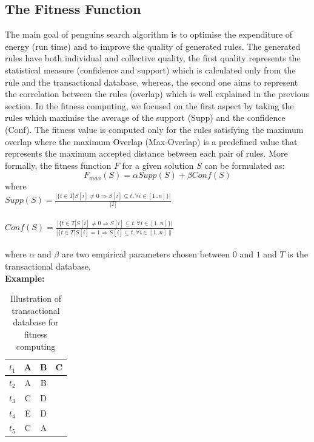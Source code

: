 \documentclass[preprint,12pt]{elsarticle}
\begin{document}
\subsection{The Fitness Function}
The main goal of penguins search algorithm is to optimise the
expenditure of energy (run time) and to improve the
quality of generated rules. The generated rules have both
individual and collective quality, the first quality represents
the statistical measure (confidence and support) which is
calculated only from the rule and the transactional database,
whereas, the second one aims to represent the correlation between
the rules (overlap) which is well explained in the previous
section. In the fitness computing, we focused on the first aspect
by taking the rules which maximise the average of the support (Supp) and the confidence (Conf). The fitness value is computed only for the rules satisfying the maximum overlap where
the maximum Overlap (Max-Overlap) is a predefined value that represents the
maximum accepted distance between each pair of rules.
More formally, the fitness function $F$ for a given solution $S$
can be formulated as:\\
\begin{equation}
\label{equa:eq1} F_{max}(S)=\alpha Supp(S) + \beta Conf
(S)
\end{equation}
where\\

$Supp(S)= \frac{|\{t \in T | S[i] \neq 0 \Rightarrow S[i]
\subseteq t,  \forall i \in [1..n]\}|}{|T|}$\\ \\
$Conf(S)= \frac{|\{t \in T | S[i]\neq 0 \Rightarrow
S[i]\subseteq t, \forall i \in [1..n]\}|}{|\{t \in T | S[i]=1
\Rightarrow S[i]\subseteq t, \forall i \in [1..n]\|}$\\
\\
where
$\alpha$ and $\beta$ are two empirical parameters chosen between
$0$ and $1$ and $T$ is the transactional database.
\\
\textbf{Example:}
\begin{table}[h]
\centering
\begin{tabular}{c c c c}
\hline
$t_{1}$& A & B & C\\
\hline
$t_{2}$& A & B & \\
\hline
$t_{3}$& C & D & \\
\hline
$t_{4}$& E & D & \\
\hline
$t_{5}$& C & A &\\
\hline
\end{tabular}
\caption{Illustration of transactional database for fitness computing}
\label{TransacionalDatabaseIllustration}
\end{table}
\end{document}

